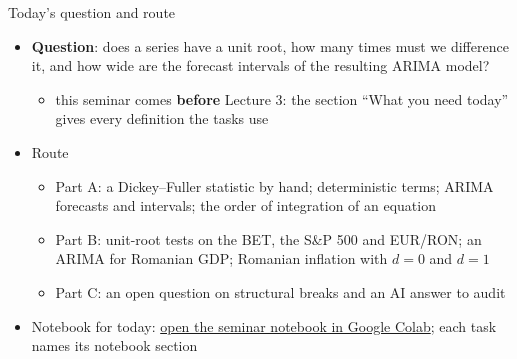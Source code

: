 \begin{frame}{Today's question and route}
\itemsize{\small}
\begin{itemize}
    \item \textbf{Question}: does a series have a unit root, how many times must we difference it, and how wide are the forecast intervals of the resulting ARIMA model?
    \begin{itemize}
        \item this seminar comes \textbf{before} Lecture 3: the section ``What you need today'' gives every definition the tasks use
    \end{itemize}
    \item Route
    \begin{itemize}
        \item Part A: a Dickey--Fuller statistic by hand; deterministic terms; ARIMA forecasts and intervals; the order of integration of an equation
        \item Part B: unit-root tests on the BET, the S\&P 500 and EUR/RON; an ARIMA for Romanian GDP; Romanian inflation with $d = 0$ and $d = 1$
        \item Part C: an open question on structural breaks and an AI answer to audit
    \end{itemize}
    \item Notebook for today: \href{\nb}{open the seminar notebook in Google Colab}; each task names its notebook section
\end{itemize}
\end{frame}

